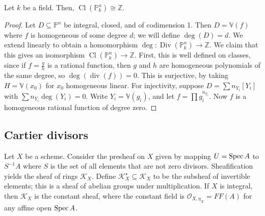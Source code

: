 \begin{proposition}
    Let \( k \) be a field.
    Then, \( \operatorname{Cl}(\mathbb P^n_k) \cong \mathbb Z \).
\end{proposition}
\begin{proof}
    Let \( D \subseteq \mathbb P^n \) be integral, closed, and of codimension 1.
    Then \( D = \mathbb V(f) \) where \( f \) is homogeneous of some degree \( d \); we will define \( \deg(D) = d \).
    We extend linearly to obtain a homomorphism \( \deg : \operatorname{Div}(\mathbb P^n_k) \to \mathbb Z \).
    We claim that this gives an isomorphism \( \operatorname{Cl}(\mathbb P^n_k) \to \mathbb Z \).
    First, this is well defined on classes, since if \( f = \frac{g}{h} \) is a rational function, then \( g \) and \( h \) are homogeneous polynomials of the same degree, so \( \deg(\operatorname{div}(f)) = 0 \).
    This is surjective, by taking \( H = \mathbb V(x_0) \) for \( x_0 \) homogeneous linear.
    For injectivity, suppose \( D = \sum n_{Y_i} [Y_i] \) with \( \sum n_{Y_i} \deg(Y_i) = 0 \).
    Write \( Y_i = \mathbb V(g_i) \), and let \( f = \prod g_i^{n_{Y_i}} \).
    Now \( f \) is a homogeneous rational function of degree zero.
\end{proof}

\subsection{Cartier divisors}
Let \( X \) be a scheme.
Consider the presheaf on \( X \) given by mapping \( U = \operatorname{Spec} A \) to \( S^{-1}A \) where \( S \) is the set of all elements that are not zero divisors.
Sheafification yields the sheaf of rings \( \mathcal K_X \).
Define \( \mathcal K_X^\star \subseteq \mathcal K_X \) to be the subsheaf of invertible elements; this is a sheaf of abelian groups under multiplication.
If \( X \) is integral, then \( \mathcal K_X \) is the constant sheaf, where the constant field is \( \mathcal O_{X,\eta_X} = FF(A) \) for any affine open \( \operatorname{Spec} A \).

